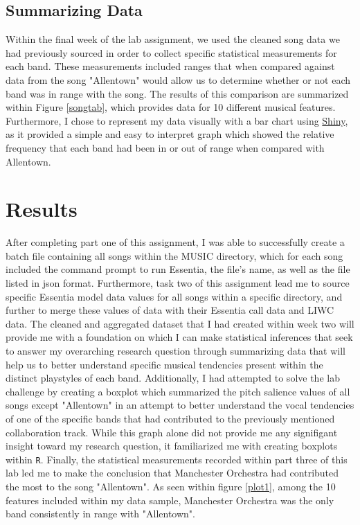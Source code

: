 \documentclass{article}\usepackage[]{graphicx}\usepackage[]{xcolor}
\begin{document}
\begin{multicols}{2}
\subsection{Summarizing Data}
Within the final week of the lab assignment, we used the cleaned song data we had previously sourced in order to collect specific statistical measurements for each band. These measurements included ranges that when compared against data from the song "Allentown" would allow us to determine whether or not each band was in range with the song. The results of this comparison are summarized within Figure \ref{songtab}, which provides data for 10 different musical features. Furthermore, I chose to represent my data visually with a bar chart using \href{https://shiny.colgate.edu/apps/Collaboratory-Apps/ggplots/}{Shiny}, as it provided a simple and easy to interpret graph which showed the relative frequency that each band had been in or out of range when compared with Allentown. 

\section{Results}
 After completing part one of this assignment, I was able to successfully create a batch file containing all songs within the MUSIC directory, which for each song included the command prompt to run Essentia, the file's name, as well as the file listed in json format.  Furthermore, task two of this assignment lead me to source specific Essentia model data values for all songs within a specific directory, and further to merge these values of data with their Essentia call data and LIWC data. The cleaned and aggregated dataset that I had created within week two will provide me with a foundation on which I can make statistical inferences that seek to answer my overarching research question through summarizing data that will help us to better understand specific musical tendencies present within the distinct playstyles of each band. Additionally, I had attempted to solve the lab challenge by creating a boxplot which summarized the pitch salience values of all songs except "Allentown" in an attempt to better understand the vocal tendencies of one of the specific bands that had contributed to the previously mentioned collaboration track. While this graph alone did not provide me any signifigant insight toward my research question, it familiarized me with creating boxplots within \texttt{R}. Finally, the statistical measurements recorded within part three of this lab led me to make the conclusion that Manchester Orchestra had contributed the most to the song "Allentown". As seen within figure \ref{plot1}, among the 10 features included within my data sample, Manchester Orchestra was the only band consistently in range with "Allentown".





\end{multicols}
\end{document}
